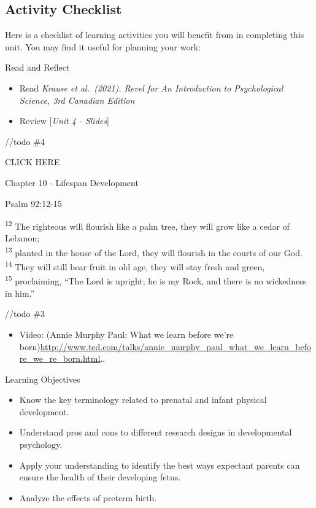\documentclass[
]{book}
\providecommand{\tightlist}{%
  \setlength{\itemsep}{0pt}\setlength{\parskip}{0pt}}
\begin{document}
\hypertarget{activity-checklist-3}{%
\subsection*{Activity Checklist}\label{activity-checklist-3}}

Here is a checklist of learning activities you will benefit from in completing this unit. You may find it useful for planning your work:

\begin{reflect}
{Read and Reflect}

\begin{itemize}
\tightlist
\item
  Read \emph{Krause et al.~(2021). Revel for An Introduction to Psychological Science, 3rd Canadian Edition}\\
\item
  Review {[}\emph{Unit 4 - Slides}{]}
\end{itemize}

//todo \#4

CLICK HERE

Chapter 10 - Lifespan Development

Psalm 92:12-15

\textsuperscript{12} The righteous will flourish like a palm tree, they will grow like a cedar of Lebanon;\\
\textsuperscript{13} planted in the house of the Lord, they will flourish in the courts of our God.\\
\textsuperscript{14} They will still bear fruit in old age, they will stay fresh and green,\\
\textsuperscript{15} proclaiming, ``The Lord is upright; he is my Rock, and there is no wickedness in him.''

//todo \#3

\begin{itemize}
\tightlist
\item
  Video: (Annie Murphy Paul: What we learn before we're born){\url{http://www.ted.com/talks/annie_murphy_paul_what_we_learn_before_we_re_born.html}}..
\end{itemize}

Learning Objectives

\begin{itemize}
\tightlist
\item
  Know the key terminology related to prenatal and infant physical development.\\
\item
  Understand pros and cons to different research designs in developmental psychology.\\
\item
  Apply your understanding to identify the best ways expectant parents can ensure the health of their developing fetus.\\
\item
  Analyze the effects of preterm birth.
\end{itemize}


\end{reflect}
\end{document}
